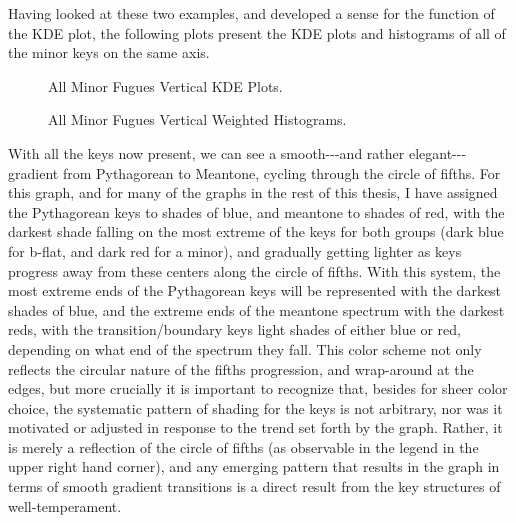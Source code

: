 Having looked at these two examples, and developed a sense for the
function of the KDE plot, the following plots present the KDE plots and
histograms of all of the minor keys on the same axis.




\begin{figure}[H]
    \begin{center}
    \caption{All Minor Fugues Vertical KDE Plots.}
    \end{center}
\end{figure}
    



\begin{figure}[H]
    \begin{center}
    \caption{All Minor Fugues Vertical Weighted Histograms.}
    \end{center}
\end{figure}
    
    With all the keys now present, we can see a smooth-\/-\/-and rather
elegant-\/-\/-gradient from Pythagorean to Meantone, cycling through the
circle of fifths. For this graph, and for many of the graphs in the rest
of this thesis, I have assigned the Pythagorean keys to shades of blue,
and meantone to shades of red, with the darkest shade falling on the
most extreme of the keys for both groups (dark blue for b-flat, and dark
red for a minor), and gradually getting lighter as keys progress away
from these centers along the circle of fifths. With this system, the
most extreme ends of the Pythagorean keys will be represented with the
darkest shades of blue, and the extreme ends of the meantone spectrum
with the darkest reds, with the transition/boundary keys light shades of
either blue or red, depending on what end of the spectrum they fall.
This color scheme not only reflects the circular nature of the fifths
progression, and wrap-around at the edges, but more crucially it is
important to recognize that, besides for sheer color choice, the
systematic pattern of shading for the keys is not arbitrary, nor was it
motivated or adjusted in response to the trend set forth by the graph.
Rather, it is merely a reflection of the circle of fifths (as observable
in the legend in the upper right hand corner), and any emerging pattern
that results in the graph in terms of smooth gradient transitions is a
direct result from the key structures of well-temperament.

